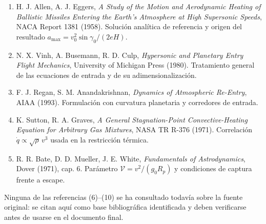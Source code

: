 \begin{enumerate}[label=(\arabic*),start=6]
    \item H. J. Allen, A. J. Eggers, \textit{A Study of the Motion and Aerodynamic Heating of Ballistic Missiles Entering the Earth's Atmosphere at High Supersonic Speeds}, NACA Report 1381 (1958). Solución analítica de referencia y origen del resultado \(a_{\max}=v_0^2\sin\gamma_0/(2eH)\).
    \item N. X. Vinh, A. Busemann, R. D. Culp, \textit{Hypersonic and Planetary Entry Flight Mechanics}, University of Michigan Press (1980). Tratamiento general de las ecuaciones de entrada y de su adimensionalización.
    \item F. J. Regan, S. M. Anandakrishnan, \textit{Dynamics of Atmospheric Re-Entry}, AIAA (1993). Formulación con curvatura planetaria y corredores de entrada.
    \item K. Sutton, R. A. Graves, \textit{A General Stagnation-Point Convective-Heating Equation for Arbitrary Gas Mixtures}, NASA TR R-376 (1971). Correlación \(\dot q\propto\sqrt{\rho}\,v^3\) usada en la restricción térmica.
    \item R. R. Bate, D. D. Mueller, J. E. White, \textit{Fundamentals of Astrodynamics}, Dover (1971), cap. 6. Parámetro \(\mathcal{V}=v^2/(g_0R_p)\) y condiciones de captura frente a escape.
\end{enumerate}

Ninguna de las referencias (6)--(10) se ha consultado todavía sobre la fuente original: se citan aquí como base bibliográfica identificada y deben verificarse antes de usarse en el documento final.
